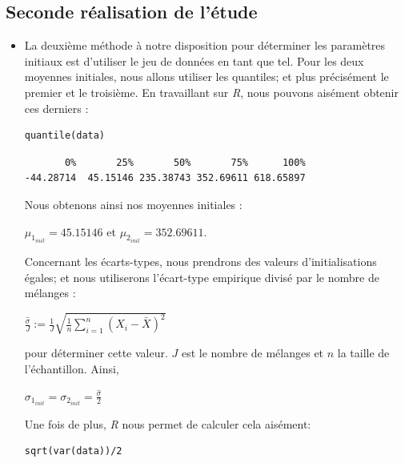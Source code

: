 \documentclass[frenchb]{report}
\newcommand{\1}{\mathbbm{1}}
\theoremstyle{definition}\newtheorem{defn}{Définition}
\theoremstyle{definition}\newtheorem{exm}{Exemple}
\theoremstyle{definition}\newtheorem{nota}{Notation}
\theoremstyle{definition}\newtheorem{rem}{Remarque}
\begin{document}
\begin{itemize}[label=\adfflowerleft]
\subsection{Seconde réalisation de l'étude}

\begin{itemize}[label=\adfflowerleft]

\item La deuxième méthode à notre disposition pour déterminer les paramètres initiaux est d'utiliser le jeu de données en tant que tel. Pour les deux moyennes initiales, nous allons utiliser les quantiles; et plus précisément le premier et le troisième. En travaillant sur \textit{R}, nous pouvons aisément obtenir ces derniers :

\begin{lstlisting}
quantile(data)
\end{lstlisting}


\begin{verbatim}
       0%       25%       50%       75%      100% 
-44.28714  45.15146 235.38743 352.69611 618.65897
\end{verbatim}
Nous obtenons ainsi nos moyennes initiales :
\begin{center} 
$\mu_{1_{init}} =  45.15146$ et $\mu_{2_{init}} = 352.69611$. 
\end{center}

Concernant les écarts-types, nous prendrons des valeurs d'initialisations égales; et nous utiliserons l'écart-type empirique divisé par le nombre de mélanges :
\begin{center}
$\displaystyle\frac{\widehat{\sigma}}{J} := \displaystyle\frac{1}{J}\sqrt{\displaystyle\frac{1}{n}\sum_{i=1}^n(X_i - \bar{X})^2}$
\end{center}
pour déterminer cette valeur. $J$ est le nombre de mélanges et $n$ la taille de l'échantillon. \newline
Ainsi, 
\begin{center}
$\sigma_{1_{init}} = \sigma_{2_{init}} = \displaystyle\frac{\widehat{\sigma}}{2}$
\end{center}

Une fois de plus, \textit{R} nous permet de calculer cela aisément: 

\begin{lstlisting}
sqrt(var(data))/2
\end{lstlisting}


\end{itemize}
\end{itemize}
\end{document}
